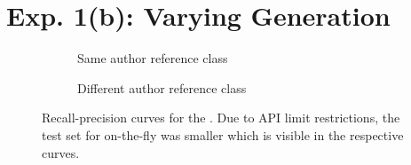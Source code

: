 \section{Exp. 1(b): Varying \Imp{} Generation}

\begin{figure}[H]
  \centering
  \begin{subfigure}{\textwidth}
    \centering
    
    \caption{Same author reference class}
    \label{fig:student_essays_same_author}
  \end{subfigure}
  \begin{subfigure}{\textwidth}
    \centering
    
    \caption{Different author reference class}
    \label{fig:student_essays_different_author}
  \end{subfigure}
  \caption{Recall-precision curves for the \dataStudent{}. 
Due to API limit restrictions, the test set for on-the-fly was smaller which is visible in the respective curves.
  }
  \label{fig:diff_imp_gen_student_essays}
\end{figure}
